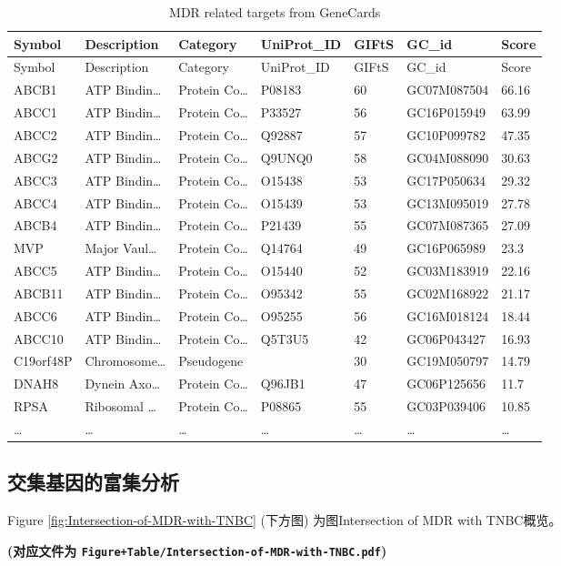 \documentclass[
]{article}
\begin{document}
\begin{longtable}[]{@{}lllllll@{}}
\caption{\label{tab:MDR-related-targets-from-GeneCards}MDR related targets from GeneCards}\tabularnewline
\toprule
Symbol & Description & Category & UniProt\_ID & GIFtS & GC\_id & Score\tabularnewline
\midrule
\endfirsthead
\toprule
Symbol & Description & Category & UniProt\_ID & GIFtS & GC\_id & Score\tabularnewline
\midrule
\endhead
ABCB1 & ATP Bindin\ldots{} & Protein Co\ldots{} & P08183 & 60 & GC07M087504 & 66.16\tabularnewline
ABCC1 & ATP Bindin\ldots{} & Protein Co\ldots{} & P33527 & 56 & GC16P015949 & 63.99\tabularnewline
ABCC2 & ATP Bindin\ldots{} & Protein Co\ldots{} & Q92887 & 57 & GC10P099782 & 47.35\tabularnewline
ABCG2 & ATP Bindin\ldots{} & Protein Co\ldots{} & Q9UNQ0 & 58 & GC04M088090 & 30.63\tabularnewline
ABCC3 & ATP Bindin\ldots{} & Protein Co\ldots{} & O15438 & 53 & GC17P050634 & 29.32\tabularnewline
ABCC4 & ATP Bindin\ldots{} & Protein Co\ldots{} & O15439 & 53 & GC13M095019 & 27.78\tabularnewline
ABCB4 & ATP Bindin\ldots{} & Protein Co\ldots{} & P21439 & 55 & GC07M087365 & 27.09\tabularnewline
MVP & Major Vaul\ldots{} & Protein Co\ldots{} & Q14764 & 49 & GC16P065989 & 23.3\tabularnewline
ABCC5 & ATP Bindin\ldots{} & Protein Co\ldots{} & O15440 & 52 & GC03M183919 & 22.16\tabularnewline
ABCB11 & ATP Bindin\ldots{} & Protein Co\ldots{} & O95342 & 55 & GC02M168922 & 21.17\tabularnewline
ABCC6 & ATP Bindin\ldots{} & Protein Co\ldots{} & O95255 & 56 & GC16M018124 & 18.44\tabularnewline
ABCC10 & ATP Bindin\ldots{} & Protein Co\ldots{} & Q5T3U5 & 42 & GC06P043427 & 16.93\tabularnewline
C19orf48P & Chromosome\ldots{} & Pseudogene & & 30 & GC19M050797 & 14.79\tabularnewline
DNAH8 & Dynein Axo\ldots{} & Protein Co\ldots{} & Q96JB1 & 47 & GC06P125656 & 11.7\tabularnewline
RPSA & Ribosomal \ldots{} & Protein Co\ldots{} & P08865 & 55 & GC03P039406 & 10.85\tabularnewline
\ldots{} & \ldots{} & \ldots{} & \ldots{} & \ldots{} & \ldots{} & \ldots{}\tabularnewline
\bottomrule
\end{longtable}

\hypertarget{ux4ea4ux96c6ux57faux56e0ux7684ux5bccux96c6ux5206ux6790}{%
\subsection{交集基因的富集分析}\label{ux4ea4ux96c6ux57faux56e0ux7684ux5bccux96c6ux5206ux6790}}

Figure \ref{fig:Intersection-of-MDR-with-TNBC} (下方图) 为图Intersection of MDR with TNBC概览。

\textbf{(对应文件为 \texttt{Figure+Table/Intersection-of-MDR-with-TNBC.pdf})}
\end{document}
